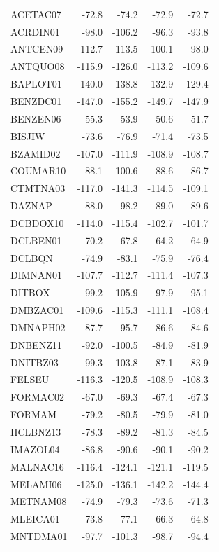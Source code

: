 \begin{longtable}{lrrrr}
ACETAC07 & -72.8 & -74.2 & -72.9 & -72.7 \\
ACRDIN01 & -98.0 & -106.2 & -96.3 & -93.8 \\
ANTCEN09 & -112.7 & -113.5 & -100.1 & -98.0 \\
ANTQUO08 & -115.9 & -126.0 & -113.2 & -109.6 \\
BAPLOT01 & -140.0 & -138.8 & -132.9 & -129.4 \\
BENZDC01 & -147.0 & -155.2 & -149.7 & -147.9 \\
BENZEN06 & -55.3 & -53.9 & -50.6 & -51.7 \\
BISJIW & -73.6 & -76.9 & -71.4 & -73.5 \\
BZAMID02 & -107.0 & -111.9 & -108.9 & -108.7 \\
COUMAR10 & -88.1 & -100.6 & -88.6 & -86.7 \\
CTMTNA03 & -117.0 & -141.3 & -114.5 & -109.1 \\
DAZNAP & -88.0 & -98.2 & -89.0 & -89.6 \\
DCBDOX10 & -114.0 & -115.4 & -102.7 & -101.7 \\
DCLBEN01 & -70.2 & -67.8 & -64.2 & -64.9 \\
DCLBQN & -74.9 & -83.1 & -75.9 & -76.4 \\
DIMNAN01 & -107.7 & -112.7 & -111.4 & -107.3 \\
DITBOX & -99.2 & -105.9 & -97.9 & -95.1 \\
DMBZAC01 & -109.6 & -115.3 & -111.1 & -108.4 \\
DMNAPH02 & -87.7 & -95.7 & -86.6 & -84.6 \\
DNBENZ11 & -92.0 & -100.5 & -84.9 & -81.9 \\
DNITBZ03 & -99.3 & -103.8 & -87.1 & -83.9 \\
FELSEU & -116.3 & -120.5 & -108.9 & -108.3 \\
FORMAC02 & -67.0 & -69.3 & -67.4 & -67.3 \\
FORMAM & -79.2 & -80.5 & -79.9 & -81.0 \\
HCLBNZ13 & -78.3 & -89.2 & -81.3 & -84.5 \\
IMAZOL04 & -86.8 & -90.6 & -90.1 & -90.2 \\
MALNAC16 & -116.4 & -124.1 & -121.1 & -119.5 \\
MELAMI06 & -125.0 & -136.1 & -142.2 & -144.4 \\
METNAM08 & -74.9 & -79.3 & -73.6 & -71.3 \\
MLEICA01 & -73.8 & -77.1 & -66.3 & -64.8 \\
MNTDMA01 & -97.7 & -101.3 & -98.7 & -94.4 \\

\end{longtable}
